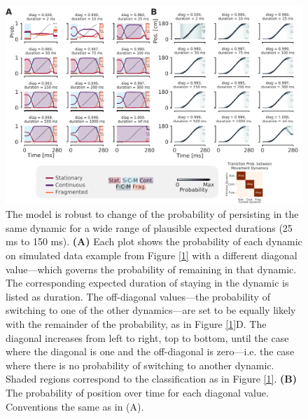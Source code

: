 \documentclass[times, twoside]{zHenriquesLab-StyleBioRxiv}
\begin{document}
\newpage

\beginsupplement
\captionsetup*{format=largeformat}

\begin{figure}%
\centering
\includegraphics[width=1.0\linewidth]{figures/Figure1-supplemental1/Figure1_v3_supplemental1}
\caption{The model is robust to change of the probability of persisting in the same dynamic for a wide range of plausible expected durations (25 ms to 150 ms). \textbf{(A)} Each plot shows the probability of each dynamic on simulated data example from Figure \ref{1} with a different diagonal value---which governs the probability of remaining in that dynamic. The corresponding expected duration of staying in the dynamic is listed as duration. The off-diagonal values---the probability of switching to one of the other dynamics---are set to be equally likely with the remainder of the probability, as in Figure \ref{1}D. The diagonal increases from left to right, top to bottom, until the case where the diagonal is one and the off-diagonal is zero---i.e. the case where there is no probability of switching to another dynamic. Shaded regions correspond to the classification as in Figure \ref{1}. \textbf{(B)} The probability of position over time for each diagonal value. Conventions the same as in (A).}
\label{fig:Figure1-Figure supplement 1}
\end{figure}
\end{document}
